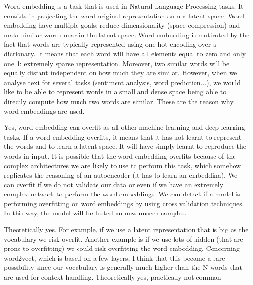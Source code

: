\begin{box-stud}
    Word embedding is a task that is used in Natural Language Processing tasks. It consists in projecting the word original representation onto a latent space. Word embedding have multiple goals: reduce dimensionality (space compression) and make similar words near in the latent space. Word embedding is motivated by the fact that words are typically represented using one-hot encoding over a dictionary. It means that each word will have all elements equal to zero and only one 1: extremely sparse representation. Moreover, two similar words will be equally distant independent on how much they are similar. However, when we analyse text for several tasks (sentiment analysis, word prediction...), we would like to be able to represent words in a small and dense space being able to directly compute how much two words are similar. These are the reason why word embeddings are used.
\end{box-stud}


\begin{box-stud}
    Yes, word embedding can overfit as all other machine learning and deep learning tasks. If a word embedding overfits, it means that it has not learnt to represent the words and to learn a latent space. It will have simply learnt to reproduce the words in input. It is possible that the word embedding overfits because of the complex architectures we are likely to use to perform this task, which somehow replicates the reasoning of an autoencoder (it has to learn an embeddina). We can overfit if we do not validate our data or even if we have an extremely complex network to perform the word embeddings. We can detect if a model is performing overfitting on word embeddings by using cross validation techniques. In this way, the model will be tested on new unseen samples.
\end{box-stud}

\begin{box-stud}
    Theoretically yes. For example, if we use a latent representation that is big as the vocabulary we risk overfit. Another example is if we use lots of hidden (that are prone to overfitting) we could risk overfitting the word embedding. Concerning word2vect, which is based on a few layers, I think that this become a rare possibility since our vocabulary is generally much higher than the N-words that are used for context handling. Theoretically yes, practically not common
\end{box-stud}

